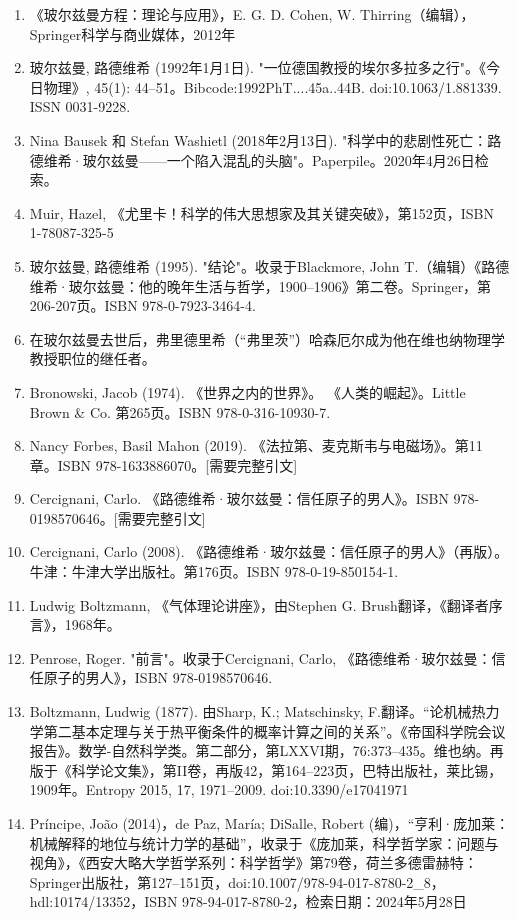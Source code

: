\begin{enumerate}
\item 《玻尔兹曼方程：理论与应用》，E. G. D. Cohen, W. Thirring（编辑），Springer科学与商业媒体，2012年  
\item 玻尔兹曼, 路德维希 (1992年1月1日). "一位德国教授的埃尔多拉多之行"。《今日物理》, 45(1): 44–51。Bibcode:1992PhT....45a..44B. doi:10.1063/1.881339. ISSN 0031-9228.  
\item Nina Bausek 和 Stefan Washietl (2018年2月13日). "科学中的悲剧性死亡：路德维希·玻尔兹曼——一个陷入混乱的头脑"。Paperpile。2020年4月26日检索。  
\item Muir, Hazel, 《尤里卡！科学的伟大思想家及其关键突破》，第152页，ISBN 1-78087-325-5  
\item 玻尔兹曼, 路德维希 (1995). "结论"。收录于Blackmore, John T.（编辑）《路德维希·玻尔兹曼：他的晚年生活与哲学，1900–1906》第二卷。Springer，第206-207页。ISBN 978-0-7923-3464-4.  
\item 在玻尔兹曼去世后，弗里德里希（“弗里茨”）哈森厄尔成为他在维也纳物理学教授职位的继任者。
\item Bronowski, Jacob (1974). 《世界之内的世界》。 《人类的崛起》。Little Brown & Co. 第265页。ISBN 978-0-316-10930-7.  
\item Nancy Forbes, Basil Mahon (2019). 《法拉第、麦克斯韦与电磁场》。第11章。ISBN 978-1633886070。[需要完整引文]  
\item Cercignani, Carlo. 《路德维希·玻尔兹曼：信任原子的男人》。ISBN 978-0198570646。[需要完整引文]  
\item Cercignani, Carlo (2008). 《路德维希·玻尔兹曼：信任原子的男人》（再版）。牛津：牛津大学出版社。第176页。ISBN 978-0-19-850154-1.  
\item Ludwig Boltzmann, 《气体理论讲座》，由Stephen G. Brush翻译，《翻译者序言》，1968年。  
\item Penrose, Roger. "前言"。收录于Cercignani, Carlo, 《路德维希·玻尔兹曼：信任原子的男人》，ISBN 978-0198570646.
\item Boltzmann, Ludwig (1877). 由Sharp, K.; Matschinsky, F.翻译。“论机械热力学第二基本定理与关于热平衡条件的概率计算之间的关系”。《帝国科学院会议报告》。数学-自然科学类。第二部分，第LXXVI期，76:373–435。维也纳。再版于《科学论文集》，第II卷，再版42，第164–223页，巴特出版社，莱比锡，1909年。Entropy 2015, 17, 1971–2009. doi:10.3390/e17041971  
\item Príncipe, João (2014)，de Paz, María; DiSalle, Robert (编)，“亨利·庞加莱：机械解释的地位与统计力学的基础”，收录于《庞加莱，科学哲学家：问题与视角》，《西安大略大学哲学系列：科学哲学》第79卷，荷兰多德雷赫特：Springer出版社，第127–151页，doi:10.1007/978-94-017-8780-2_8，hdl:10174/13352，ISBN 978-94-017-8780-2，检索日期：2024年5月28日  

\end{enumerate}
